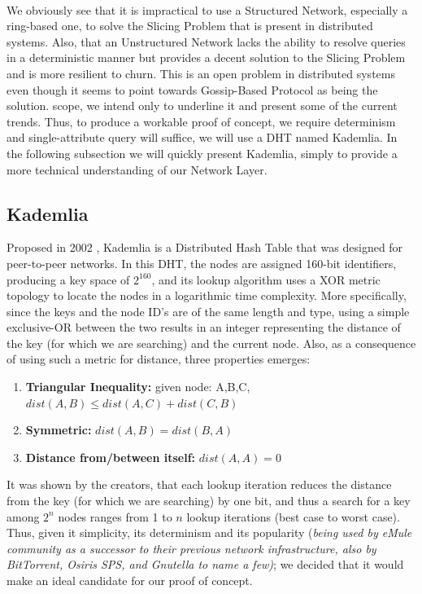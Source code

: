 \documentclass[11pt]{amsart}
\begin{document}
\begin{enumarate}
        \\ We obviously see that it is impractical to use a Structured Network, especially
        a ring-based one, to solve the Slicing Problem that is present in distributed
        systems. Also, that an Unstructured Network lacks the ability to resolve queries
        in a deterministic manner but provides a decent solution to the Slicing Problem
        and is more resilient to churn. This is an open problem in distributed systems
        even though it seems to point towards Gossip-Based Protocol as being the solution.
        scope, we intend only to underline it and present some of the current
        trends. Thus, to produce a workable proof of concept, we require determinism and
        single-attribute query will suffice, we will use a DHT named Kademlia. In the
        following subsection we will quickly present Kademlia, simply to provide a more
        technical understanding of our Network Layer.

        \subsection{Kademlia}
        Proposed in 2002 \cite{maymounkov2002kademlia}, Kademlia is a Distributed Hash
        Table that was designed for peer-to-peer networks. In this DHT, the nodes are
        assigned 160-bit identifiers, producing a key space of $2^160$, and its lookup
        algorithm uses a XOR metric topology to locate the nodes in a logarithmic time
        complexity. More specifically, since the keys and the node ID's are of the same
        length and type, using a simple exclusive-OR between the two results in an integer
        representing the distance of the key (for which we are searching) and the current
        node. Also, as a consequence of using such a metric for distance, three properties
        emerges:
        \begin{enumerate}
          \item \textbf{Triangular Inequality:} given node: A,B,C,  $dist(A,B) \leq dist(A,C) + dist(C,B)$
          \item \textbf{Symmetric:} $dist(A,B)=dist(B,A)$
          \item \textbf{Distance from/between itself:} $dist(A,A)=0$
        \end{enumerate}
        It was shown by the creators, that each lookup iteration reduces the distance from
        the key (for which we are searching) by one bit, and thus a search for a key among
        $2^n$ nodes ranges from 1 to $n$ lookup iterations (best case to worst
        case). Thus, given it simplicity, its determinism and its popularity (\emph{being
          used by eMule community as a successor to their previous network infrastructure,
          also by BitTorrent, Osiris SPS, and Gnutella to name a few)}; we decided that it
        would make an ideal candidate for our proof of concept.


\end{enumarate}
\end{document}
